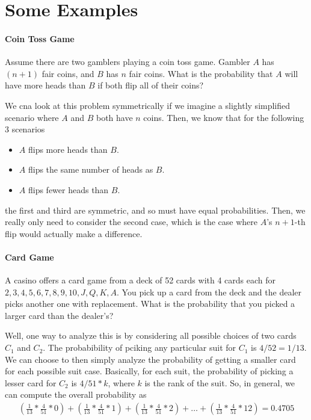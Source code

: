 \documentclass[10pt,a4paper]{article}
\begin{document}
\section*{Some Examples}

\paragraph{Coin Toss Game} Assume there are two gamblers playing a coin toss game. Gambler $A$ has $(n+1)$ fair coins, and $B$ has $n$ fair coins. What is the probability that $A$ will have more heads than $B$ if both flip all of their coins?

We cna look at this problem symmetrically if we imagine a slightly simplified scenario where $A$ and $B$ both have $n$ coins. Then, we know that for the following 3 scenarios
\begin{itemize}
    \item $A$ flips more heads than $B$.
    \item $A$ flips the same number of heads as $B$.
    \item $A$ flips fewer heads than $B$. 
\end{itemize}
the first and third are symmetric, and so must have equal probabilities. Then, we really only need to consider the second case, which is the case where $A$'s $n+1$-th flip would actually make a difference.

\paragraph*{Card Game} A casino offers a card game from a deck of 52 cards with 4 cards each for $2,3,4,5,6,7,8,9,10,J,Q,K,A$. You pick up a card from the deck and the dealer picks another one with replacement. What is the probability that you picked a larger card than the dealer's?

Well, one way to analyze this is by considering all possible choices of two cards $C_1$ and $C_2$. The probabibility of pciking any particular suit for $C_1$ is $4/52 = 1/13$. We can choose to then simply analyze the probability of getting a smaller card for each possible suit case. Basically, for each suit, the probability of picking a lesser card for $C_2$ is $4/51 * k$, where $k$ is the rank of the suit. So, in general, we can compute the overall probability as
\begin{align*}
    \left(\frac{1}{13}*\frac{4}{51}*0\right) + \left(\frac{1}{13}*\frac{4}{51}*1\right) + \left(\frac{1}{13}*\frac{4}{51}*2\right) + \dots + \left(\frac{1}{13}*\frac{4}{51}*12\right) = 0.4705
\end{align*}


% 
% 
\end{document}

